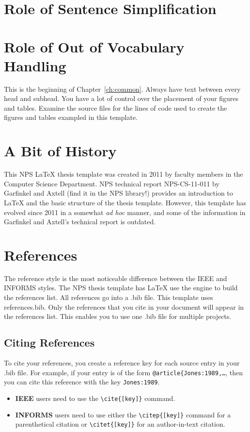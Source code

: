 \section{Role of Sentence Simplification}

\section{Role of Out of Vocabulary Handling}
This is the beginning of Chapter~\ref{ch:common}. 
Always have text between every head and subhead. You have a lot of control over the placement of your figures and tables. Examine the source files for the lines of code used to create the figures and tables exampled in this template. 

\section{A Bit of History}

This NPS \LaTeX{} thesis template was created in 2011 by faculty members in the Computer Science Department. NPS technical report NPS-CS-11-011 by Garfinkel and Axtell (find it in the NPS library!) provides an introduction to \LaTeX{} and the basic structure of the thesis template. However, this template has evolved since 2011 in a somewhat {\it ad hoc} manner, and some of the information in Garfinkel and Axtell's technical report is outdated.

\section{References}
The reference style is the most noticeable difference between the IEEE and INFORMS styles.
The NPS thesis template has \LaTeX{} use the \BibTeX{} engine to build the references list.
All references go into a .bib file.  This template uses references.bib.  Only the references that you cite in your document will appear in the references list.  This enables you to use one .bib file for multiple projects.

\subsection{Citing References}
To cite your references, you create a reference key for each source entry in your .bib file.  For example, if your \BibTeX{} entry is of the form {\tt @article\{Jones:1989,\dots}, then you can cite this reference with the key {\tt Jones:1989}.
\begin{itemize}
    \item \textbf{IEEE} users need to use the \verb|\cite{[key]}| command.
    \item \textbf{INFORMS} users need to use either the \verb|\citep{[key]}| command for a parenthetical citation or \verb|\citet{[key]}| for an author-in-text citation.
\end{itemize}

